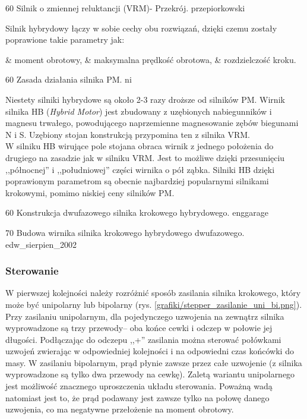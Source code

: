 		{60}
		{Silnik o zmiennej reluktancji (VRM)- Przekrój.}
		{przepiorkowski}

Silnik hybrydowy łączy w sobie cechy obu rozwiązań, dzięki czemu zostały poprawione takie parametry jak:
\begin{easylist}
	& moment obrotowy, 
	& maksymalna prędkość obrotowa, 
	& rozdzielczość kroku.
\end{easylist}

		{60}
		{Zasada działania silnika PM.}
		{ni}

Niestety silniki hybrydowe są około 2-3 razy droższe od silników PM. Wirnik silnika HB ({\em Hybrid Motor}) jest zbudowany z uzębionych nabiegunników i magnesu trwałego, powodującego naprzemienne magnesowanie zębów biegunami N i S. Uzębiony stojan konstrukcją przypomina ten z silnika VRM. \\
		
W silniku HB wirujące pole stojana obraca wirnik z jednego położenia do drugiego na zasadzie jak w silniku VRM. Jest to możliwe dzięki przesunięciu ,,północnej'' i ,,południowej'' części wirnika o pół ząbka. Silniki HB dzięki poprawionym parametrom są obecnie najbardziej popularnymi silnikami krokowymi, pomimo niskiej ceny silników PM.
		
		{60}
		{Konstrukcja dwufazowego silnika krokowego hybrydowego.}
		{enggarage}		
		
		{70}
		{Budowa wirnika silnika krokowego hybrydowego dwufazowego.}
		{edw_sierpien_2002}

\subsubsection{Sterowanie}
\label{sss:sterowanie_krokowy}

W pierwszej kolejności należy rozróżnić sposób zasilania silnika krokowego, który może być unipolarny lub bipolarny (rys. \ref{grafiki/stepper_zasilanie_uni_bi.png}). \\

Przy zasilaniu unipolarnym, dla pojedynczego uzwojenia na zewnątrz silnika wyprowadzone są trzy przewody-- oba końce cewki i odczep w połowie jej długości. Podłączając do odczepu ,,+'' zasilania można sterować połówkami uzwojeń zwierając w odpowiedniej kolejności i na odpowiedni czas końcówki do masy. W zasilaniu bipolarnym, prąd płynie zawsze przez całe uzwojenie (z silnika wyprowadzone są tylko dwa przewody na cewkę). Zaletą wariantu unipolarnego jest możliwość znacznego uproszczenia układu sterowania. Poważną wadą natomiast jest to, że prąd podawany jest zawsze tylko na połowę danego uzwojenia, co ma negatywne przełożenie na moment obrotowy. 

